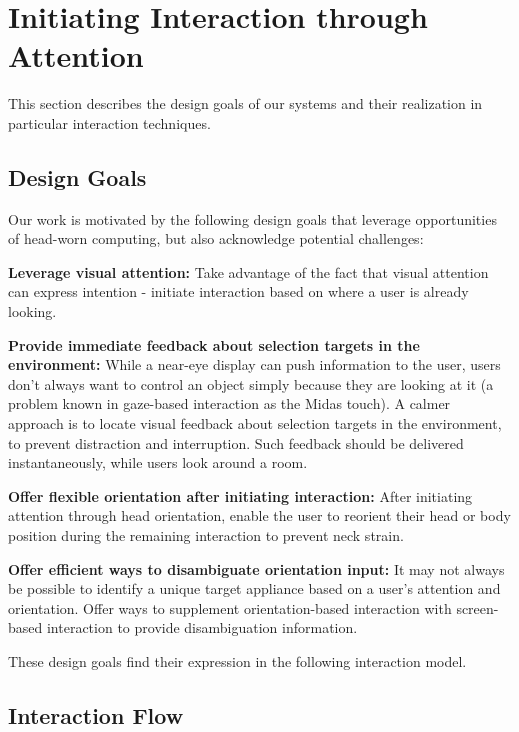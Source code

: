\section{Initiating Interaction through Attention}
This section describes the design goals of our systems and their realization in particular interaction techniques.

\subsection{Design Goals}
Our work is motivated by the following design goals that leverage opportunities of head-worn computing, but also acknowledge potential challenges:

{\bf Leverage visual attention:} Take advantage of the fact that visual attention can express intention - initiate interaction based on where a user is already looking. 

{\bf Provide immediate feedback about selection targets in the environment:} While a near-eye display can push information to the user, users don't always want to control an object simply because they are looking at it (a problem known in gaze-based interaction as the Midas touch). A calmer~\cite{weiser_coming_1997} approach is to locate visual feedback about selection targets in the environment, to prevent distraction and interruption. Such feedback should be delivered instantaneously, while users look around a room.

{\bf Offer flexible orientation after initiating interaction:} After initiating attention through head orientation, enable the user to reorient their head or body position during the remaining interaction to prevent neck strain.

{\bf Offer efficient ways to disambiguate orientation input:} It may not always be possible to identify a unique target appliance based on a user's attention and orientation. Offer ways to supplement orientation-based interaction with screen-based interaction to provide disambiguation information.

These design goals find their expression in the following interaction model.

\subsection{Interaction Flow}


